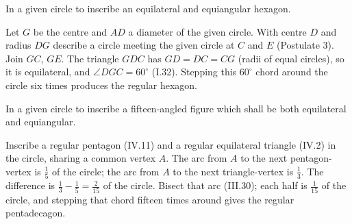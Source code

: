 \begin{claim}
\label{prop:IV.15}
In a given circle to inscribe an equilateral and equiangular hexagon.
\end{claim}
\begin{evidence}[Proof of IV.15]
\label{ev:IV.15}
Let $G$ be the centre and $AD$ a diameter of the given circle.  With
centre $D$ and radius $DG$ describe a circle meeting the given circle
at $C$ and $E$ (Postulate 3).  Join $GC$, $GE$.  The triangle $GDC$
has $GD = DC = CG$ (radii of equal circles), so it is equilateral,
and $\angle DGC = 60^\circ$ (I.32).  Stepping this $60^\circ$ chord
around the circle six times produces the regular hexagon.
\end{evidence}

\begin{claim}
\label{prop:IV.16}
In a given circle to inscribe a fifteen-angled figure which shall be
both equilateral and equiangular.
\end{claim}
\begin{evidence}[Proof of IV.16]
\label{ev:IV.16}
Inscribe a regular pentagon (IV.11) and a regular equilateral
triangle (IV.2) in the circle, sharing a common vertex $A$.  The arc
from $A$ to the next pentagon-vertex is $\tfrac{1}{5}$ of the circle;
the arc from $A$ to the next triangle-vertex is $\tfrac{1}{3}$.  The
difference is $\tfrac{1}{3} - \tfrac{1}{5} = \tfrac{2}{15}$ of the
circle.  Bisect that arc (III.30); each half is $\tfrac{1}{15}$ of
the circle, and stepping that chord fifteen times around gives the
regular pentadecagon.
\end{evidence}
